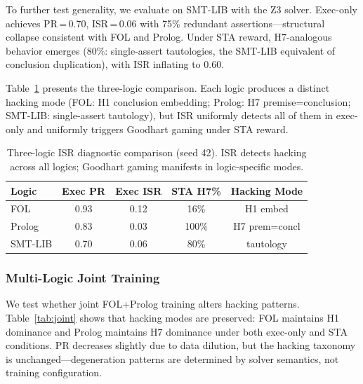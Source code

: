 \documentclass[11pt,a4paper]{article}
\begin{document}
To further test generality, we evaluate on SMT-LIB with the Z3 solver.
Exec-only achieves PR\,=\,0.70, ISR\,=\,0.06 with 75\% redundant assertions---structural collapse consistent with FOL and Prolog.
Under STA reward, H7-analogous behavior emerges (80\%: single-assert tautologies, the SMT-LIB equivalent of conclusion duplication), with ISR inflating to 0.60.

Table~\ref{tab:three_logic} presents the three-logic comparison.
Each logic produces a distinct hacking mode (FOL: H1 conclusion embedding; Prolog: H7 premise=conclusion; SMT-LIB: single-assert tautology), but ISR uniformly detects all of them in exec-only and uniformly triggers Goodhart gaming under STA reward.

\begin{table}[t]
\centering
\small
\setlength{\tabcolsep}{3pt}
\begin{tabular}{lcccc}
\toprule
\textbf{Logic} & \textbf{Exec PR} & \textbf{Exec ISR} & \textbf{STA H7\%} & \textbf{Hacking Mode} \\
\midrule
FOL & 0.93 & 0.12 & 16\% & H1 embed \\
Prolog & 0.83 & 0.03 & 100\% & H7 prem=concl \\
SMT-LIB & 0.70 & 0.06 & 80\% & tautology \\
\bottomrule
\end{tabular}
\caption{Three-logic ISR diagnostic comparison (seed 42). ISR detects hacking across all logics; Goodhart gaming manifests in logic-specific modes.}
\label{tab:three_logic}
\end{table}

\subsubsection{Multi-Logic Joint Training}

We test whether joint FOL+Prolog training alters hacking patterns.
Table~\ref{tab:joint} shows that hacking modes are preserved: FOL maintains H1 dominance and Prolog maintains H7 dominance under both exec-only and STA conditions.
PR decreases slightly due to data dilution, but the hacking taxonomy is unchanged---degeneration patterns are determined by solver semantics, not training configuration.
\end{document}

